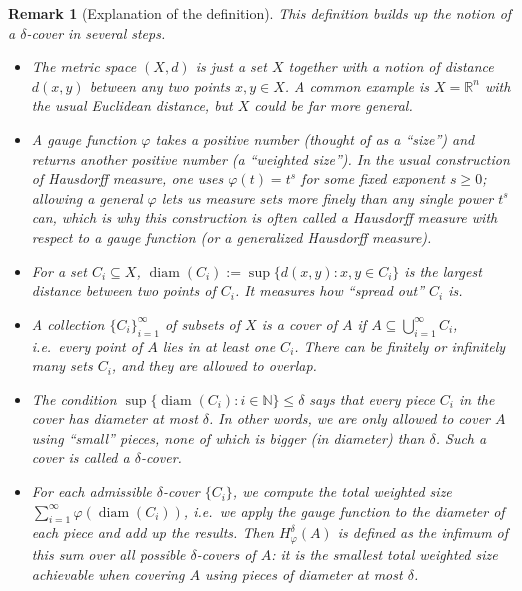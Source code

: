 \documentclass{article}
\newtheorem{remark}{Remark}
\begin{document}
\begin{remark}[Explanation of the definition]
This definition builds up the notion of a $\delta$-cover in several steps. 

\begin{itemize}[itemsep=1em]
    \item The metric space $(X,d)$ is just a set $X$ together with a notion of distance $d(x,y)$ between any two points $x, y \in X$. A common example is $X = \mathbb{R}^n$ with the usual Euclidean distance, but $X$ could be far more general.

    \item A gauge function $\varphi$ takes a positive number (thought of as a ``size'') and returns another positive number (a ``weighted size''). In the usual construction of Hausdorff measure, one uses $\varphi(t) = t^s$ for some fixed exponent $s \ge 0$; allowing a general $\varphi$ lets us measure sets more finely than any single power $t^s$ can, which is why this construction is often called a Hausdorff measure with respect to a gauge function (or a generalized Hausdorff measure).

    \item For a set $C_i \subseteq X$, $\operatorname{diam}(C_i) := \sup\{d(x,y) : x, y \in C_i\}$ is the largest distance between two points of $C_i$. It measures how ``spread out'' $C_i$ is.

    \item A collection $\{C_i\}_{i=1}^{\infty}$ of subsets of $X$ is a \emph{cover} of $A$ if $A \subseteq \bigcup_{i=1}^\infty C_i$, i.e.\ every point of $A$ lies in at least one $C_i$. There can be finitely or infinitely many sets $C_i$, and they are allowed to overlap.

    \item The condition $\sup\{\operatorname{diam}(C_i) : i \in \mathbb{N}\} \le \delta$ says that \emph{every} piece $C_i$ in the cover has diameter at most $\delta$. In other words, we are only allowed to cover $A$ using ``small'' pieces, none of which is bigger (in diameter) than $\delta$. Such a cover is called a \emph{$\delta$-cover}.

    \item For each admissible $\delta$-cover $\{C_i\}$, we compute the total weighted size $\sum_{i=1}^\infty \varphi(\operatorname{diam}(C_i))$, i.e.\ we apply the gauge function to the diameter of each piece and add up the results. Then $H_\varphi^\delta(A)$ is defined as the \emph{infimum} of this sum over \emph{all} possible $\delta$-covers of $A$: it is the smallest total weighted size achievable when covering $A$ using pieces of diameter at most $\delta$.
\end{itemize}


\end{remark}
\end{document}
